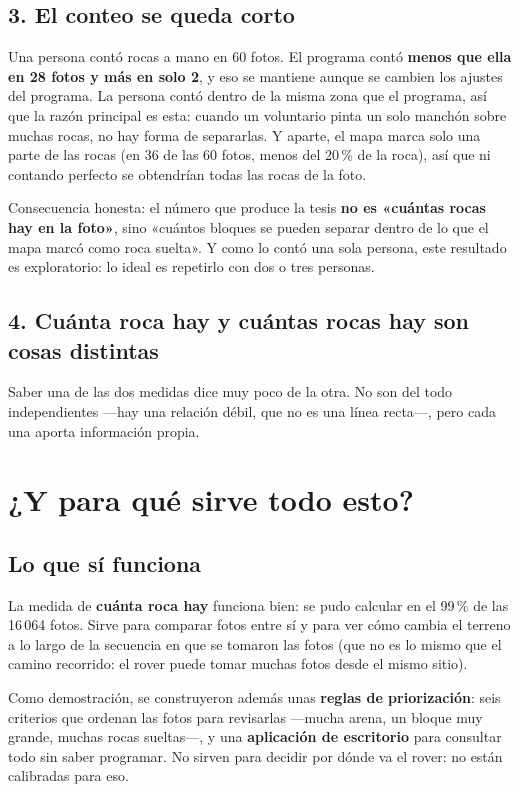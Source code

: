 \documentclass[12pt]{article}
\begin{document}
\subsection*{3. El conteo se queda corto}

Una persona contó rocas a mano en 60 fotos. El programa contó \textbf{menos que ella en 28
fotos y más en solo 2}, y eso se mantiene aunque se cambien los ajustes del programa. La
persona contó dentro de la misma zona que el programa, así que la razón principal es esta:
cuando un voluntario pinta un solo manchón sobre muchas rocas, no hay forma de separarlas. Y
aparte, el mapa marca solo una parte de las rocas (en 36 de las 60 fotos, menos del 20\,\% de la
roca), así que ni contando perfecto se obtendrían todas las rocas de la foto.

Consecuencia honesta: el número que produce la tesis \textbf{no es «cuántas rocas hay en la
foto»}, sino «cuántos bloques se pueden separar dentro de lo que el mapa marcó como roca
suelta». Y como lo contó una sola persona, este resultado es exploratorio: lo ideal es
repetirlo con dos o tres personas.

\subsection*{4. Cuánta roca hay y cuántas rocas hay son cosas distintas}

Saber una de las dos medidas dice muy poco de la otra. No son del todo independientes —hay
una relación débil, que no es una línea recta—, pero cada una aporta información propia.

\section{¿Y para qué sirve todo esto?}

\subsection*{Lo que sí funciona}

La medida de \textbf{cuánta roca hay} funciona bien: se pudo calcular en el 99\,\% de las
16\,064 fotos. Sirve para comparar fotos entre sí y para ver cómo cambia el terreno a lo
largo de la secuencia en que se tomaron las fotos (que no es lo mismo que el camino
recorrido: el rover puede tomar muchas fotos desde el mismo sitio).

Como demostración, se construyeron además unas \textbf{reglas de priorización}: seis criterios
que ordenan las fotos para revisarlas —mucha arena, un bloque muy grande, muchas rocas
sueltas—, y una \textbf{aplicación de escritorio} para consultar todo sin saber programar. No
sirven para decidir por dónde va el rover: no están calibradas para eso.
\end{document}
